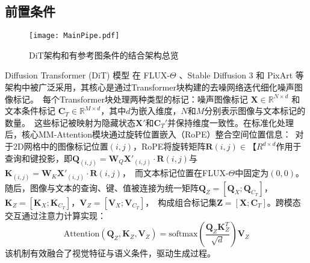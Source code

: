 \subsection{前置条件}
\begin{figure}[htbp]
    \centering
    \texttt{[image: MainPipe.pdf]}
    \caption{DiT架构和有参考图条件的结合架构总览}
    \label{fig3}
\end{figure}
Diffusion Transformer (DiT) 模型 \cite{peebles2023scalable} 在 FLUX-$\Theta$ \cite{blackforestlabs_flux}、Stable Diffusion 3 \cite{esser2024scaling} 和 PixArt \cite{chen2023pixart} 等架构中被广泛采用，其核心是通过Transformer块构建的去噪网络迭代细化噪声图像标记。\
每个Transformer块处理两种类型的标记：噪声图像标记 $\mathbf{X} \in \mathbb{R}^{N \times d}$ 和文本条件标记 $\mathbf{C}_T \in \mathbb{R}^{M \times d}$，其中$d$为嵌入维度，$N$和$M$分别表示图像与文本标记的数量。\
这些标记被映射为隐藏状态$\mathbf{X}'$和$\mathbf{C}_T'$并保持维度一致性。在标准化处理后，核心MM-Attention模块通过旋转位置嵌入（RoPE）\cite{lazos2005rope}整合空间位置信息：\
对于2D网格中的图像标记位置$(i,j)$，RoPE将旋转矩阵$\mathbf{R}(i,j) \in \mathbb【{R}^{d \times d}$作用于查询和键投影，即$\mathbf{Q}_{(i,j)} = \mathbf{W}_Q\mathbf{X}'_{(i,j)} \cdot \mathbf{R}(i,j)$与$\mathbf{K}_{(i,j)} = \mathbf{W}_K\mathbf{X}'_{(i,j)} \cdot \mathbf{R}(i,j)$，\
而文本标记位置在FLUX-$\Theta$中固定为$(0,0)$。随后，图像与文本的查询、键、值被连接为统一矩阵$\mathbf{Q}_Z = [\mathbf{Q}_X; \mathbf{Q}_{C_T}]$，$\mathbf{K}_Z = [\mathbf{K}_X; \mathbf{K}_{C_T}]$，$\mathbf{V}_Z = [\mathbf{V}_X; \mathbf{V}_{C_T}]$，\
构成组合标记集$\mathbf{Z} = [\mathbf{X}; \mathbf{C}_T]$。跨模态交互通过注意力计算实现：
\begin{equation}
    \text{Attention}(\mathbf{Q}_Z, \mathbf{K}_Z, \mathbf{V}_Z) = \text{softmax}\left(\frac{\mathbf{Q}_Z\mathbf{K}_Z^T}{\sqrt{d}}\right)\mathbf{V}_Z
\end{equation}该机制有效融合了视觉特征与语义条件，驱动生成过程。
